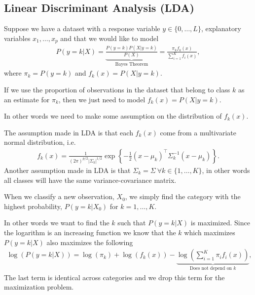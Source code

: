 \documentclass[aspectratio=169,10pt]{beamer}
\begin{document}
\subsection{Linear Discriminant Analysis (LDA)}
\begin{frame}{\secname}{\subsecname}
  Suppose we have a dataset with a response variable $y\in\{0,\ldots,L\}$, explanatory variables $x_1, \ldots, x_p$ and that we would like to model
  \begin{align}
    P(y=k|X) =\underbrace{\frac{P(y = k)P(X|y=k)}{P(X)}}_{\text{Bayes Theorem}} = \frac{\pi_k f_k(x)}{\sum_{i=1}^K f_i(x)},
  \end{align}
  where $\pi_k = P(y=k)$ and $f_k(x) = P(X|y=k)$.

  If we use the proportion of observations in the dataset that belong to class $k$ as an estimate for $\pi_k$, then we just need to model $f_k(x) =P(X|y=k)$.

  In other words we need to make some assumption on the distribution of $f_k(x)$.
\end{frame}

\begin{frame}{\secname}{\subsecname}
  The assumption made in LDA is that each $f_k(x)$ come from a multivariate normal distribution, i.e.\!
  \begin{align}
    f_k(x) = \frac{1}{(2\pi)^{p/2} |\Sigma_k|^{1/2}} \exp\left\{
      -\frac{1}{2}(x - \mu_k)^\top\Sigma_k^{-1}(x - \mu_k)
    \right\}.
  \end{align}
  Another assumption made in LDA is that $\Sigma_k = \Sigma \ \forall k \in \{1,\ldots,K\}$, in other words all classes will have the same variance-covariance matrix.
\end{frame}

\begin{frame}{\secname}{\subsecname}
  When we classify a new observation, $X_0$, we simply find the category with the highest probability, $P(y = k|X_0)$ for $k = 1,\ldots,K$.

  In other words we want to find the $k$ such that $P(y=k|X)$ is maximized.
  Since the logarithm is an increasing function we know that the $k$ which maximizes $P(y=k|X)$ also maximizes the following
  \begin{align}
    \log(P(y=k|X)) = \log(\pi_k) + \log(f_k(x)) - \underbrace{\log\left(\sum_{i = 1}^K \pi_i f_i(x)\right)}_{\text{Does not depend on $k$}},
  \end{align} 
  The last term is identical across categories and we drop this term for the maximization problem.
\end{frame}
\end{document}
